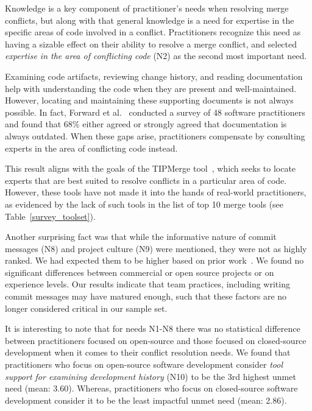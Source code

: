 Knowledge is a key component of practitioner's needs when resolving merge conflicts, but along with that general knowledge is a need for expertise in the specific areas of code involved in a conflict.
Practitioners recognize this need as having a sizable effect on their ability to resolve a merge conflict, and selected \textit{expertise in the area of conflicting code} (N2) as the second most important need.

Examining code artifacts, reviewing change history, and reading documentation help with understanding the code when they are present and well-maintained.
However, locating and maintaining these supporting documents is not always possible.
In fact, Forward et al.~\cite{forward2002documentation} conducted a survey of 48 software practitioners and found that 68\% either agreed or strongly agreed that documentation is always outdated.
When these gaps arise, practitioners compensate by consulting experts in the area of conflicting code instead.

This result aligns with the goals of the TIPMerge tool~\cite{CostaSarma}, which seeks to locate experts that are best suited to resolve conflicts in a particular area of code.
However, these tools have not made it into the hands of real-world practitioners, as evidenced by the lack of such tools in the list of top 10 merge tools (see Table~\ref{survey_toolset}).

Another surprising fact was that while the informative nature of commit messages (N8) and project culture (N9) were mentioned, they were not as highly ranked. %
We had expected them to be higher based on prior work~\cite{yamauchi2014clustering, hindle2009automatic, cortes2014automatically, hattori2008nature}. We found no significant differences between commercial or open source projects or on experience levels.
Our results indicate that team practices, including writing commit messages may have matured enough, such that these factors are no longer considered critical in our sample set. 


\label{oss_vs_closed_tool_support} 
It is interesting to note that for needs N1-N8 there was no statistical difference between practitioners focused on open-source and those focused on closed-source development when it comes to their conflict resolution needs.
We found that practitioners who focus on open-source software development consider \textit{tool support for examining development history} (N10) to be the 3rd highest unmet need (mean: 3.60).
Whereas, practitioners who focus on closed-source software development consider it to be the least impactful unmet need (mean: 2.86).

